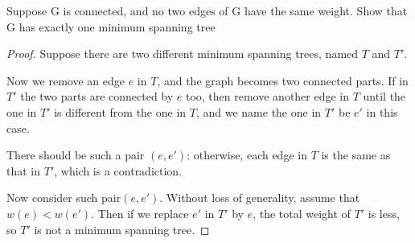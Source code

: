 


\begin{thm}{}{}
    Suppose G is connected, and no two edges of G have the same weight. Show that G has exactly one minimum spanning tree
\end{thm}
\begin{proof}[Proof]
    Suppose there are two different minimum spanning trees, named $T$ and $T'$. 

    Now we remove an edge $e$ in $T$, and the graph becomes two connected parts. 
    If in $T'$ the two parts are connected by $e$ too, 
    then remove another edge in $T$ until the one in $T'$ is different from the one in $T$, 
    and we name the one in $T'$ be $e'$ in this case. 

    There should be such a pair $(e,e')$: 
    otherwise, each edge in $T$ is the same as that in $T'$, which is a contradiction. 

    Now consider such pair$(e,e')$. Without loss of generality, assume that $w(e)<w(e')$. 
    Then if we replace $e'$ in $T'$ by $e$, the total weight of $T'$ is less, so $T'$ is not a minimum spanning tree. 
\end{proof}
